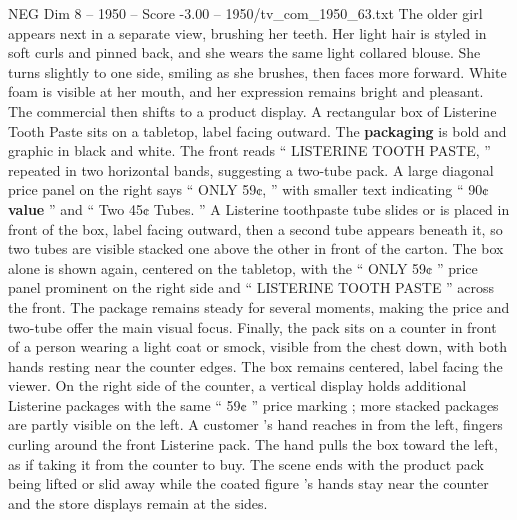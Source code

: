 \begin{textsample}{NEG Dim 8 – 1950 – Score -3.00 – 1950/tv\_com\_1950\_63.txt}
The older girl appears next in a separate view, brushing her teeth.
Her light hair is styled in soft curls and pinned back, and she wears the same light collared blouse.
She turns slightly to one side, smiling as she brushes, then faces more forward.
White foam is visible at her mouth, and her expression remains bright and pleasant.
The commercial then shifts to a product display.
A rectangular box of Listerine Tooth Paste sits on a tabletop, label facing outward.
The \textbf{packaging} is bold and graphic in black and white.
The front reads “ LISTERINE TOOTH PASTE, ” repeated in two horizontal bands, suggesting a two-tube pack.
A large diagonal price panel on the right says “ ONLY 59¢, ” with smaller text indicating “ 90¢ \textbf{value} ” and “ Two 45¢ Tubes. ” A Listerine toothpaste tube slides or is placed in front of the box, label facing outward, then a second tube appears beneath it, so two tubes are visible stacked one above the other in front of the carton.
The box alone is shown again, centered on the tabletop, with the “ ONLY 59¢ ” price panel prominent on the right side and “ LISTERINE TOOTH PASTE ” across the front.
The package remains steady for several moments, making the price and two-tube offer the main visual focus.
Finally, the pack sits on a counter in front of a person wearing a light coat or smock, visible from the chest down, with both hands resting near the counter edges.
The box remains centered, label facing the viewer.
On the right side of the counter, a vertical display holds additional Listerine packages with the same “ 59¢ ” price marking ; more stacked packages are partly visible on the left.
A customer ’s hand reaches in from the left, fingers curling around the front Listerine pack.
The hand pulls the box toward the left, as if taking it from the counter to buy.
The scene ends with the product pack being lifted or slid away while the coated figure ’s hands stay near the counter and the store displays remain at the sides.

\end{textsample}
